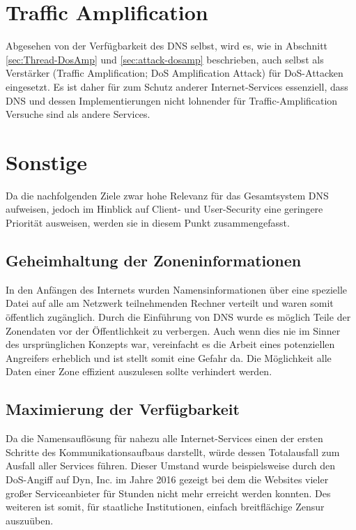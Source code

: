 \section{Traffic Amplification}
\label{sec:goals-trafficamp}
Abgesehen von der Verfügbarkeit des DNS selbst, wird es, wie in Abschnitt \ref{sec:Thread-DosAmp} und \ref{sec:attack-dosamp} beschrieben, auch selbst als Verstärker (Traffic Amplification; DoS Amplification Attack) für DoS-Attacken eingesetzt. Es ist daher für zum Schutz anderer Internet-Services essenziell, dass DNS und dessen Implementierungen nicht lohnender für Traffic-Amplification Versuche sind als andere Services. 

\section{Sonstige}

Da die nachfolgenden Ziele zwar hohe Relevanz für das Gesamtsystem DNS aufweisen, jedoch im Hinblick auf Client- und User-Security eine geringere Priorität ausweisen, werden sie in diesem Punkt zusammengefasst.

\subsection{Geheimhaltung der Zoneninformationen}
In den Anfängen des Internets wurden Namensinformationen über eine spezielle Datei auf alle am Netzwerk teilnehmenden Rechner verteilt \cite{rfc1035} und waren somit öffentlich zugänglich. Durch die Einführung von DNS wurde es möglich Teile der Zonendaten vor der Öffentlichkeit zu verbergen. Auch wenn dies nie im Sinner des ursprünglichen Konzepts war, vereinfacht es die Arbeit eines potenziellen Angreifers erheblich und ist stellt somit eine Gefahr da. Die Möglichkeit alle Daten einer Zone effizient auszulesen sollte verhindert werden.

\subsection{Maximierung der Verfügbarkeit}
Da die Namensauflösung für nahezu alle Internet-Services einen der ersten Schritte des Kommunikationsaufbaus darstellt, würde dessen Totalausfall zum Ausfall aller Services führen. Dieser Umstand wurde beispielsweise durch den DoS-Angiff auf Dyn, Inc. im Jahre 2016 gezeigt \cite{Newman2016} bei dem die Websites vieler großer Serviceanbieter für Stunden nicht mehr erreicht werden konnten. Des weiteren ist somit, für staatliche Institutionen, einfach breitflächige Zensur auszuüben\cite{turkybbc2017}\cite{turkywp2018}. 

